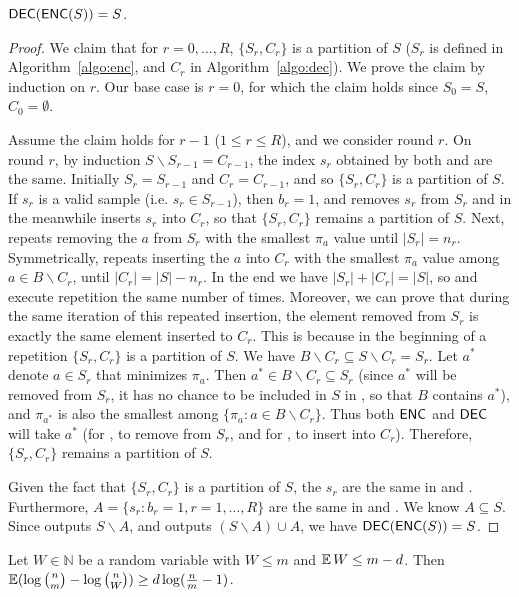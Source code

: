 \begin{lemma}\label{lemma:zero-fail-prob}
  $\textsf{DEC}(\textsf{ENC}(S))=S$.
\end{lemma}
\begin{proof}
  We claim that for $r=0,\ldots, R$, $\{S_r, C_r\}$ is a partition of $S$ ($S_r$ is defined in Algorithm~\ref{algo:enc}, and $C_r$ in Algorithm~\ref{algo:dec}). We prove the claim by induction on $r$. Our base case is $r=0$, for which the claim holds since $S_0 = S$, $C_0 = \emptyset$.
  
  Assume the claim holds for $r-1$ ($1\le r \le R$), and we consider round $r$.  On round $r$, by induction $S\backslash S_{r-1}=C_{r-1}$, the index $s_r$ obtained by both \enc and \dec are the same.  Initially $S_r=S_{r-1}$ and $C_r=C_{r-1}$, and so $\{S_r,C_r\}$ is a partition of $S$.  If $s_r$ is a valid sample (i.e. $s_r\in S_{r-1}$), then $b_r=1$, and \enc removes $s_r$ from $S_r$ and in the meanwhile \dec inserts $s_r$ into $C_r$, so that $\{S_r, C_r\}$ remains a partition of $S$. Next, \enc repeats removing the $a$ from $S_r$ with the smallest $\pi_a$ value until $|S_r|=n_r$. Symmetrically, \dec repeats inserting the $a$ into $C_r$ with the smallest $\pi_a$ value among $a\in B\backslash C_r$, until $|C_r|=|S|-n_r$. In the end we have $|S_r|+|C_r|=|S|$, so \enc and \dec execute repetition the same number of times.  Moreover, we can prove that during the same iteration of this repeated insertion, the element removed from $S_r$ is exactly the same element inserted to $C_r$.  This is because in the beginning of a repetition $\{S_r, C_r\}$ is a partition of $S$.  We have $B\backslash C_r\subseteq S\backslash C_r=S_r$. Let $a^*$ denote $a\in S_r$ that minimizes $\pi_a$.  Then $a^*\in B\backslash C_r\subseteq S_r$ (since $a^*$ will be removed from $S_r$, it has no chance to be included in $S$ in \enc, so that $B$ contains $a^*$), and $\pi_{a^*}$ is also the smallest among $\{\pi_a : a\in B\backslash C_r\}$.  Thus both $\textsf{ENC}$ and $\textsf{DEC}$ will take $a^{*}$ (for \enc, to remove from $S_r$, and for \dec, to insert into $C_r$).  Therefore, $\{S_r, C_r\}$ remains a partition of $S$.
  
  Given the fact that $\{S_r, C_r\}$ is a partition of $S$, the $s_r$ are the same in \enc and \dec.  Furthermore, $A=\{s_r : b_r=1,r=1,\ldots, R\}$ are the same in \enc and \dec.  We know $A\subseteq S$.  Since \enc outputs $S\backslash A$, and \dec outputs $(S\backslash A)\cup A$, we have $\textsf{DEC}(\textsf{ENC}(S))=S$.
\end{proof}

\begin{lemma} \label{lemma:bits-saving}
Let $W\in \mathbb{N}$ be a random variable with $W\le m$ and $\operatorname*{\mathbb{E}} W\le m-d$. Then $\operatorname*{\mathbb{E}}(\log {n \choose m}-\log {n \choose W})\ge d \log (\frac{n}{m}-1)$.
\end{lemma}

